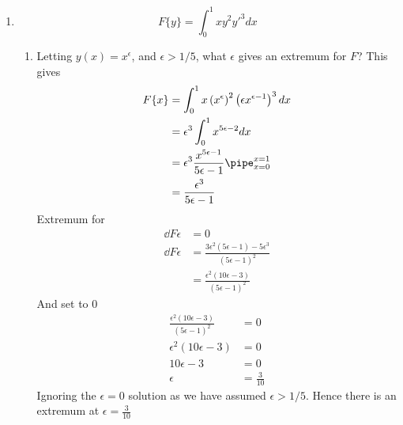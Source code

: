 \documentclass{X:/Documents/Coding/Latex/myassignment}
\begin{document}
\begin{enumerate}
	\item 
	\[F\{y\} = \int_0^1 xy^2 y'^3 dx\]
	\begin{enumerate}
		\item Letting $y(x) = x^\epsilon$, and $\epsilon > 1/5$, what $\epsilon$ gives an extremum for $F$?
		This gives
		\begin{align*}
			F\{x\} &= \int_0^1 x \left(x^{\epsilon}\right)^2\left(\epsilon x^{\epsilon-1}\right)^3 dx\\
			&=\epsilon^3 \int_0^1 x^{5 \epsilon - 2} dx\\
			&= \epsilon^3 \frac{x^{5 \epsilon - 1}}{5 \epsilon -1}\pipe_{x=0}^{x=1}\\
			&= \frac{\epsilon^3}{5 \epsilon -1}
		\end{align*}
		Extremum for
		\begin{align*}
			\dd{F}\epsilon &= 0\\
			\dd{F}\epsilon &= \frac{3 \epsilon^2 (5 \epsilon -1) - 5\epsilon^3 }{(5 \epsilon -1)^2}\\
			&= \frac{\epsilon^2(10 \epsilon - 3)}{(5 \epsilon -1 )^2}
		\end{align*}
		And set to $0$
		\begin{align*}
			\frac{\epsilon^2(10 \epsilon -3)}{(5 \epsilon -1)^2} &=0\\
			\epsilon^2(10 \epsilon -3) &= 0\\
			10 \epsilon -3 &= 0\\
			\epsilon &= \frac{3}{10}
		\end{align*}
		Ignoring the $\epsilon =0 $ solution as we have assumed $\epsilon > 1/5$.
		Hence there is an extremum at $\epsilon = \frac{3}{10}$


\end{enumerate}
\end{enumerate}
\end{document}
